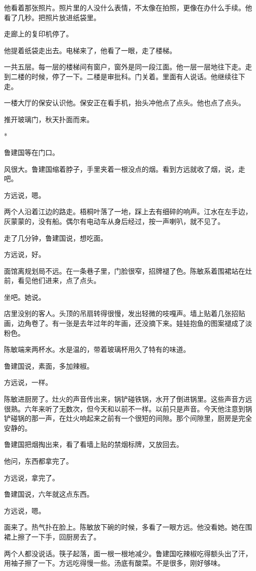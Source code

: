 \documentclass[UTF8,a5paper,11pt,openany]{ctexbook}
\newcommand{\scene}{\vspace{1em}\begin{center}*\quad*\quad*\end{center}\vspace{0.5em}}
\begin{document}
他看着那张照片。照片里的人没什么表情，不太像在拍照，更像在办什么手续。他看了几秒。把照片放进纸袋里。

走廊上的复印机停了。

他提着纸袋走出去。电梯来了，他看了一眼，走了楼梯。

一共五层。每一层的楼梯间有窗户，窗外是同一段江面。他一层一层地往下走。走到二楼的时候，停了一下。二楼是审批科。门关着。里面有人说话。他继续往下走。

一楼大厅的保安认识他。保安正在看手机，抬头冲他点了点头。他也点了点头。

推开玻璃门，秋天扑面而来。


\scene

鲁建国等在门口。

风很大。鲁建国缩着脖子，手里夹着一根没点的烟。看到方远就收了烟，说，走吧。

方远说，嗯。

两个人沿着江边的路走。梧桐叶落了一地，踩上去有细碎的响声。江水在左手边，灰蒙蒙的，没有船。偶尔有电动车从身后经过，按一声喇叭，就不见了。

走了几分钟，鲁建国说，想吃面。

方远说，好。

面馆离规划局不远。在一条巷子里，门脸很窄，招牌褪了色。陈敏系着围裙站在灶前，看见他们进来，点了点头。

坐吧。她说。

店里没别的客人。头顶的吊扇转得很慢，发出轻微的吱嘎声。墙上贴着几张招贴画，边角卷了。有一张是去年过年的年画，还没摘下来。娃娃抱鱼的图案褪成了淡粉色。

陈敏端来两杯水。水是温的，带着玻璃杯用久了特有的味道。

鲁建国说，素面，多加辣椒。

方远说，一样。

陈敏进厨房了。灶火的声音传出来，锅铲碰铁锅，水开了倒进锅里。这些声音方远很熟。六年来听了无数次，但今天和以前不一样。以前只是声音。今天他注意到锅铲碰锅的那一声，在灶火响起来之前有一个很短的间隙。那个间隙里，厨房是完全安静的。

鲁建国把烟掏出来，看了看墙上贴的禁烟标牌，又放回去。

他问，东西都拿完了。

方远说，拿完了。

鲁建国说，六年就这点东西。

方远说，嗯。

面来了。热气扑在脸上。陈敏放下碗的时候，多看了一眼方远。他没看她。她在围裙上擦了一下手，回厨房去了。

两个人都没说话。筷子起落，面一根一根地减少。鲁建国吃辣椒吃得额头出了汗，用袖子擦了一下。方远吃得慢一些。汤底有酸菜。不是很多，刚好够味。
\end{document}
